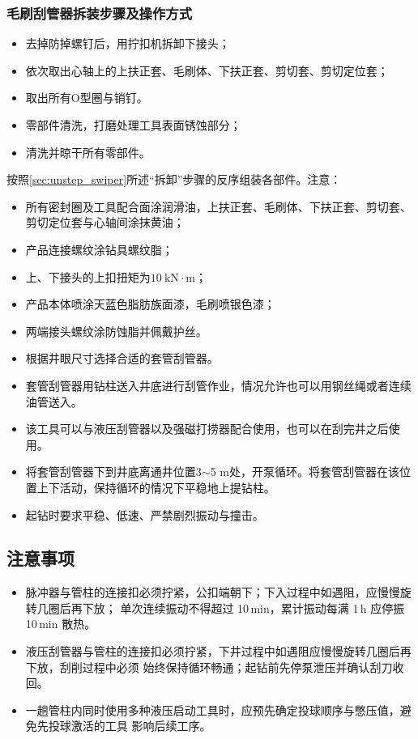 \subsubsection{毛刷刮管器拆装步骤及操作方式}
\label{sec:unstep_swiper}
	\begin{itemize}
	\item 去掉防掉螺钉后，用拧扣机拆卸下接头；
	\item 依次取出心轴上的上扶正套、毛刷体、下扶正套、剪切套、剪切定位套；
	\item 取出所有O型圈与销钉。
	\item 零部件清洗，打磨处理工具表面锈蚀部分；
	\item 清洗并晾干所有零部件。
	\end{itemize}
按照\ref{sec:unstep_swiper}所述“拆卸”步骤的反序组装各部件。注意：
\begin{itemize}
	\item 所有密封圈及工具配合面涂润滑油，上扶正套、毛刷体、下扶正套、剪切套、剪切定位套与心轴间涂抹黄油；
	\item 产品连接螺纹涂钻具螺纹脂；
	\item 上、下接头的上扣扭矩为$10\ \mathrm{kN\cdot m}$；
	\item 产品本体喷涂天蓝色脂肪族面漆，毛刷喷银色漆；
	\item 两端接头螺纹涂防蚀脂并佩戴护丝。
	\end{itemize}
\begin{itemize}
	\item 	根据井眼尺寸选择合适的套管刮管器。
	\item 套管刮管器用钻柱送入井底进行刮管作业，情况允许也可以用钢丝绳或者连续油管送入。
\end{itemize}
\begin{itemize}
	\item 	该工具可以与液压刮管器以及强磁打捞器配合使用，也可以在刮完井之后使用。
	\item 	将套管刮管器下到井底离通井位置3$\sim$5 m处，开泵循环。将套管刮管器在该位置上下活动，保持循环的情况下平稳地上提钻柱。
	\item 	起钻时要求平稳、低速、严禁剧烈振动与撞击。
\end{itemize}

\subsection{注意事项}

\begin{itemize}
	\item 脉冲器与管柱的连接扣必须拧紧，公扣端朝下；下入过程中如遇阻，应慢慢旋转几圈后再下放；
	单次连续振动不得超过 10\,min，累计振动每满 1\,h 应停振 10\,min 散热。
	\item 液压刮管器与管柱的连接扣必须拧紧，下井过程中如遇阻应慢慢旋转几圈后再下放，刮削过程中必须
	始终保持循环畅通；起钻前先停泵泄压并确认刮刀收回。
	\item 一趟管柱内同时使用多种液压启动工具时，应预先确定投球顺序与憋压值，避免先投球激活的工具
	影响后续工序。
\end{itemize}

